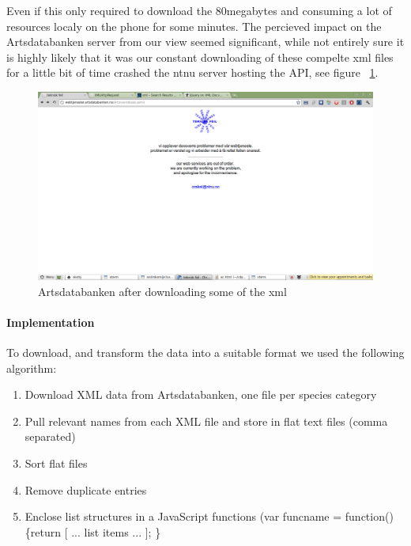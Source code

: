 		Even if this only required to download the 80megabytes and consuming a lot of resources localy on the phone for some minutes. 
		The percieved impact on the Artsdatabanken server from our view seemed significant, while not entirely sure it is highly likely that it was our constant downloading of these compelte xml files for a little bit of time crashed the ntnu server hosting the API, see figure ~\ref{fig:artsdatabanken_api}.

		\begin{figure}[htb]
			\centering
			\includegraphics[width=1\textwidth]{implementation/preparation/ntnu_server_artsdatabanken.png}
			\caption{Artsdatabanken after downloading some of the xml}
			\label{fig:artsdatabanken_api}
		\end{figure}

		\paragraph{Implementation}
			To download, and transform the data into a suitable format we used the
			following algorithm:

			\begin{enumerate}
				\item Download XML data from Artsdatabanken, one file per species category
				\item Pull relevant names from each XML file and store in flat text files (comma separated)
				\item Sort flat files
				\item Remove duplicate entries
				\item Enclose list structures in a JavaScript functions (var
				funcname = function() \{return [ ... list items ... ]; \}
			\end{enumerate}

